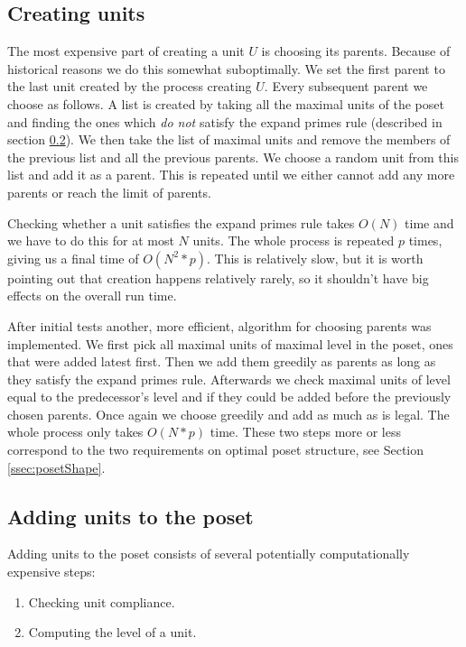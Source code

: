 \documentclass[a4paper,10pt]{article}
\begin{document}
		\subsection{Creating units}
		 \label{sec:creation}
			The most expensive part of creating a unit $U$ is choosing its parents. Because of historical reasons we do this somewhat suboptimally.
			We set the first parent to the last unit created by the process creating $U$. Every subsequent parent we choose as follows.
			A list is created by taking all the maximal units of the poset and finding the ones which \emph{do not} satisfy the expand primes rule (described in section \ref{sec:adding}).
			We then take the list of maximal units and remove the members of the previous list and all the previous parents.
			We choose a random unit from this list and add it as a parent. This is repeated until we either cannot add any more parents or reach the limit of parents.

			Checking whether a unit satisfies the expand primes rule takes $O(N)$ time and we have to do this for at most $N$ units.
			The whole process is repeated $p$ times, giving us a final time of $O(N^2*p)$.
			This is relatively slow, but it is worth pointing out that creation happens relatively rarely, so it shouldn't have big effects on the overall run time.

			After initial tests another, more efficient, algorithm for choosing parents was implemented.
			We first pick all maximal units of maximal level in the poset, ones that were added latest first.
			Then we add them greedily as parents as long as they satisfy the expand primes rule.
			Afterwards we check maximal units of level equal to the predecessor's level and if they could be added before the previously chosen parents.
			Once again we choose greedily and add as much as is legal. The whole process only takes $O(N*p)$ time.
			These two steps more or less correspond to the two requirements on optimal poset structure, see Section \ref{ssec:posetShape}.
		\subsection{Adding units to the poset}
		 \label{sec:adding}
		 Adding units to the poset consists of several potentially computationally expensive steps:
			\begin{enumerate}
				\item Checking unit compliance.
				\item Computing the level of a unit.
			\end{enumerate}
\end{document}
